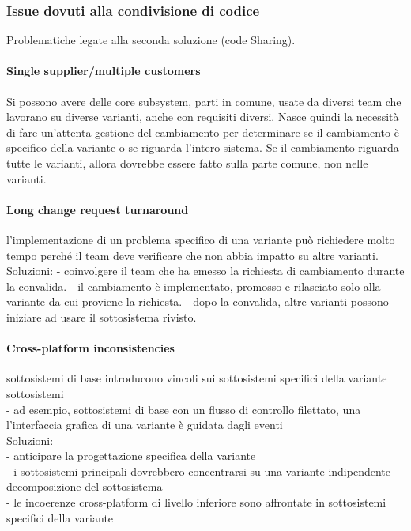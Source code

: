 \documentclass[10pt,a4paper]{book}
\begin{document}
\subsubsection{Issue dovuti alla condivisione di codice}
Problematiche legate alla seconda soluzione (code Sharing).
\paragraph{Single supplier/multiple customers}
Si possono avere delle core subsystem, parti in comune, usate da diversi team che lavorano su diverse varianti, anche con requisiti diversi.
Nasce quindi la necessità di fare un'attenta gestione del cambiamento per determinare se il cambiamento è specifico della variante o se riguarda l'intero sistema.
Se il cambiamento riguarda tutte le varianti, allora dovrebbe essere fatto sulla parte comune, non nelle varianti.

\paragraph{Long change request turnaround}
l'implementazione di un problema specifico di una variante può richiedere molto tempo perché il team deve verificare che non abbia impatto su altre varianti.
Soluzioni:
- coinvolgere il team che ha emesso la richiesta di cambiamento durante la convalida.
- il cambiamento è implementato, promosso e rilasciato solo alla variante da cui proviene la richiesta.
- dopo la convalida, altre varianti possono iniziare ad usare il sottosistema rivisto.

\paragraph{Cross-platform inconsistencies}
sottosistemi di base introducono vincoli sui sottosistemi specifici della variante sottosistemi\\
- ad esempio, sottosistemi di base con un flusso di controllo filettato, una l'interfaccia grafica di una variante è guidata dagli eventi\\
Soluzioni:\\
- anticipare la progettazione specifica della variante\\
- i sottosistemi principali dovrebbero concentrarsi su una variante indipendente decomposizione del sottosistema\\
- le incoerenze cross-platform di livello inferiore sono affrontate in sottosistemi specifici della variante\\
\end{document}
